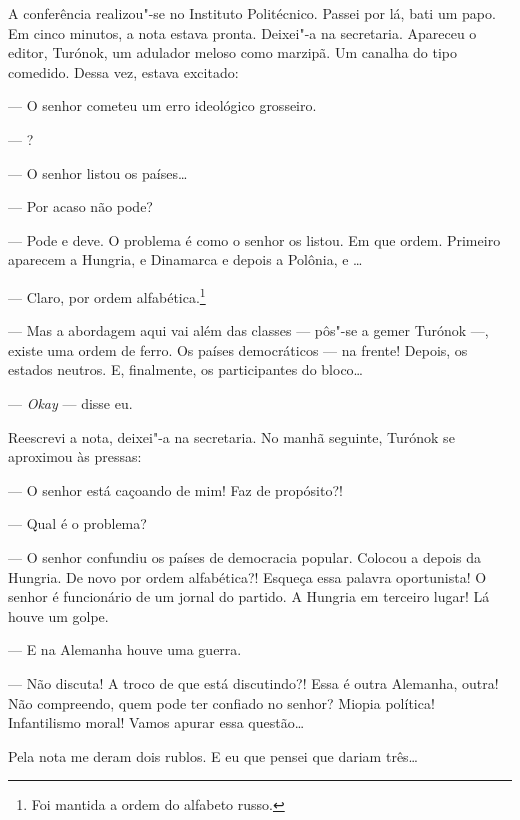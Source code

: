 A conferência realizou"-se no Instituto Politécnico. Passei por lá, bati
um papo. Em cinco minutos, a nota estava pronta. Deixei"-a na secretaria.
Apareceu o editor, Turónok, um adulador meloso como marzipã. Um canalha
do tipo comedido. Dessa vez, estava excitado:

--- O senhor cometeu um erro ideológico grosseiro.

--- ?

--- O senhor listou os países\ldots{}

--- Por acaso não pode?

--- Pode e deve. O problema é como o senhor os listou. Em que ordem.
Primeiro aparecem a Hungria,  e Dinamarca e depois a Polônia,  e
\ldots{}

--- Claro, por ordem alfabética.\footnote{Foi mantida a ordem do
  alfabeto russo.}

--- Mas a abordagem aqui vai além das classes --- pôs"-se a gemer Turónok
---, existe uma ordem de ferro. Os países democráticos --- na frente!
Depois, os estados neutros. E, finalmente, os participantes do bloco\ldots{}

--- \emph{Okay} --- disse eu.

Reescrevi a nota, deixei"-a na secretaria. No manhã seguinte, Turónok se
aproximou às pressas:

--- O senhor está caçoando de mim! Faz de propósito?!

--- Qual é o problema?

--- O senhor confundiu os países de democracia popular. Colocou a 
depois da Hungria. De novo por ordem alfabética?! Esqueça essa palavra
oportunista! O senhor é funcionário de um jornal do partido. A Hungria
em terceiro lugar! Lá houve um golpe.

--- E na Alemanha houve uma guerra.

--- Não discuta! A troco de que está discutindo?! Essa é outra Alemanha,
outra! Não compreendo, quem pode ter confiado no senhor? Miopia
política! Infantilismo moral! Vamos apurar essa questão\ldots{}

Pela nota me deram dois rublos. E eu que pensei que dariam três\ldots{}

\movetooddpage
\begin{center}
{}
\end{center}

